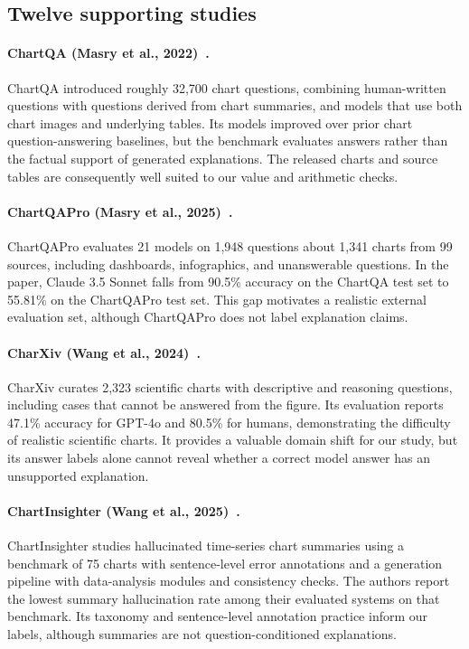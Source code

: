 \subsection{Twelve supporting studies}

\paragraph{ChartQA (Masry et al., 2022)~\cite{masry2022chartqa}.} ChartQA introduced roughly 32,700 chart questions, combining human-written questions with questions derived from chart summaries, and models that use both chart images and underlying tables. Its models improved over prior chart question-answering baselines, but the benchmark evaluates answers rather than the factual support of generated explanations. The released charts and source tables are consequently well suited to our value and arithmetic checks.

\paragraph{ChartQAPro (Masry et al., 2025)~\cite{masry2025chartqapro}.} ChartQAPro evaluates 21 models on 1,948 questions about 1,341 charts from 99 sources, including dashboards, infographics, and unanswerable questions. In the paper, Claude 3.5 Sonnet falls from 90.5\% accuracy on the ChartQA test set to 55.81\% on the ChartQAPro test set. This gap motivates a realistic external evaluation set, although ChartQAPro does not label explanation claims.

\paragraph{CharXiv (Wang et al., 2024)~\cite{wang2024charxiv}.} CharXiv curates 2,323 scientific charts with descriptive and reasoning questions, including cases that cannot be answered from the figure. Its evaluation reports 47.1\% accuracy for GPT-4o and 80.5\% for humans, demonstrating the difficulty of realistic scientific charts. It provides a valuable domain shift for our study, but its answer labels alone cannot reveal whether a correct model answer has an unsupported explanation.

\paragraph{ChartInsighter (Wang et al., 2025)~\cite{wang2025chartinsighter}.} ChartInsighter studies hallucinated time-series chart summaries using a benchmark of 75 charts with sentence-level error annotations and a generation pipeline with data-analysis modules and consistency checks. The authors report the lowest summary hallucination rate among their evaluated systems on that benchmark. Its taxonomy and sentence-level annotation practice inform our labels, although summaries are not question-conditioned explanations.

